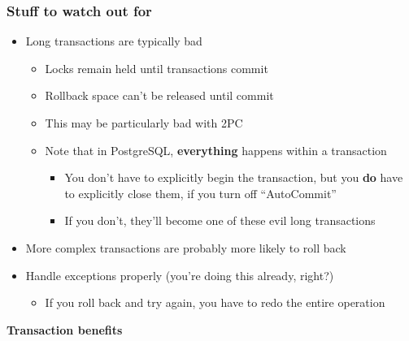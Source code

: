 \documentclass[svgnames]{beamer}
\begin{document}
\begin{frame}
    \frametitle{Stuff to watch out for}
    \begin{itemize}
        \item Long transactions are typically bad
        \begin{itemize}
            \item Locks remain held until transactions commit
            \item Rollback space can't be released until commit
            \item This may be particularly bad with 2PC
            \item Note that in PostgreSQL, \textbf{everything} happens within a transaction
            \begin{itemize}
                \item You don't have to explicitly begin the transaction, but
                you \textbf{do} have to explicitly close them, if you turn off
                ``AutoCommit''
                \item If you don't, they'll become one of these evil long transactions
            \end{itemize}
        \end{itemize}
        \item More complex transactions are probably more likely to roll back
        \item Handle exceptions properly (you're doing this already, right?)
        \begin{itemize}
            \item If you roll back and try again, you have to redo the entire operation
        \end{itemize}
    \end{itemize}
\end{frame}

\begin{frame}
    \begin{centering}
\textbf{Transaction benefits}
    \par
    \end{centering}
\end{frame}
\end{document}
